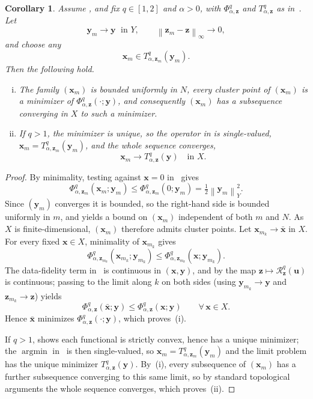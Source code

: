 \documentclass{article}
\newtheorem{corollary}[theorem]{Corollary}
\theoremstyle{remark}
\newcommand{\norm}[1]{\left\lVert #1 \right\rVert}
\newcommand{\Rreg}{\mathcal{R}}
\newcommand{\bx}{{\bm{x}}}
\newcommand{\by}{{\bm{y}}}
\newcommand{\bz}{{\bm{z}}}
\newcommand{\bu}{{\bm{u}}}
\begin{document}
\begin{corollary}
\label{cor:one-step-stability}
Assume , and fix $q\in[1,2]$ and $\alpha>0$,
with $\Phi^q_{\alpha,\bz}$ and $T^q_{\alpha,\bz}$ as in~. Let
\[
\by_m\to\by \;\text{ in } Y,
\qquad
\norm{\bz_m-\bz}_\infty\to 0,
\]
and choose any
\[
\bx_m\in T^q_{\alpha,\bz_m}(\by_m).
\]
Then the following hold.

\begin{enumerate}[(i)]
\item The family $(\bx_m)$ is bounded uniformly in $N$, every cluster point
of $(\bx_m)$ is a minimizer of $\Phi_{\alpha,\bz}^q(\cdot;\by)$, and consequently
$(\bx_m)$ has a subsequence converging in $X$ to such a minimizer.
\item If $q>1$, the minimizer is unique, so the operator in
 is single-valued, $\bx_m=T^q_{\alpha,\bz_m}(\by_m)$,
and the whole sequence converges,
\[
\bx_m\to T^q_{\alpha,\bz}(\by)\quad\text{in }X.
\]
\end{enumerate}
\end{corollary}
\begin{proof}
By minimality, testing against $\bx=0$ in~ gives
\[
\Phi_{\alpha,\bz_m}^q(\bx_m;\by_m)
\le \Phi_{\alpha,\bz_m}^q(0;\by_m)
=\tfrac12\norm{\by_m}_Y^2 .
\]
Since $(\by_m)$ converges it is bounded, so the right-hand side is bounded
uniformly in $m$, and  yields a bound on
$(\bx_m)$ independent of both $m$ and $N$. As $X$ is finite-dimensional,
$(\bx_m)$ therefore admits cluster points. Let $\bx_{m_k}\to\bar\bx$ in $X$.
For every fixed $\bx\in X$, minimality of $\bx_{m_k}$ gives
\[
\Phi_{\alpha,\bz_{m_k}}^q(\bx_{m_k};\by_{m_k})
\le \Phi_{\alpha,\bz_{m_k}}^q(\bx;\by_{m_k}).
\]
The data-fidelity term in~ is continuous in
$(\bx,\by)$, and by  the map
$\bz\mapsto\Rreg_\bz^q(\bu)$ is continuous; passing to the limit along $k$ on both
sides (using $\by_{m_k}\to\by$ and $\bz_{m_k}\to\bz$) yields
\[
\Phi_{\alpha,\bz}^q(\bar\bx;\by)
\le \Phi_{\alpha,\bz}^q(\bx;\by)
\qquad\forall\,\bx\in X .
\]
Hence $\bar\bx$ minimizes $\Phi_{\alpha,\bz}^q(\cdot;\by)$, which proves~(i).

If $q>1$,  shows each functional is strictly
convex, hence has a unique minimizer; the $\operatorname*{argmin}$
in~ is then single-valued, so
$\bx_m=T^q_{\alpha,\bz_m}(\by_m)$ and the limit problem has the unique minimizer
$T^q_{\alpha,\bz}(\by)$. By~(i), every subsequence of $(\bx_m)$ has a further
subsequence converging to this same limit, so by standard topological arguments the whole sequence converges,
which proves~(ii).
\end{proof}
\end{document}
